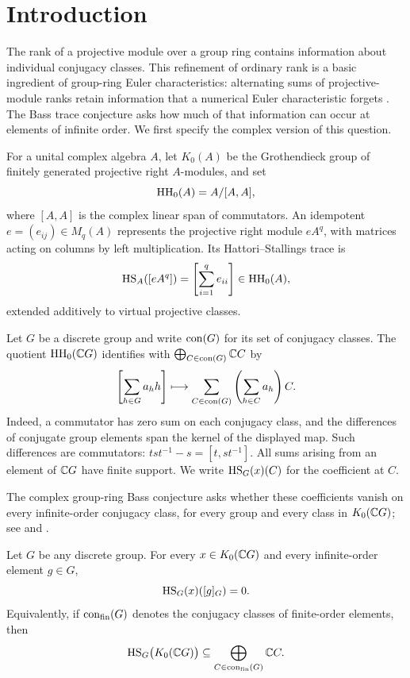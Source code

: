 \section{Introduction}
\label{sec:introduction}

The rank of a projective module over a group ring contains information
about individual conjugacy classes. This refinement of ordinary rank is
a basic ingredient of group-ring Euler characteristics: alternating sums
of projective-module ranks retain information that a numerical Euler
characteristic forgets \cite{Bass1976,Bass1979}. The Bass trace conjecture
asks how much of that information can occur at elements of infinite order.
We first specify the complex version of this question.

For a unital complex algebra $A$, let $K_0(A)$ be the Grothendieck group of
finitely generated projective right $A$-modules, and set
\[
 \operatorname{HH}_0(A)=A/[A,A],
\]
where $[A,A]$ is the complex linear span of commutators. An idempotent
$e=(e_{ij})\in M_q(A)$ represents the projective right module
$eA^q$, with matrices acting on columns by left multiplication. Its
Hattori--Stallings trace is
\[
 \operatorname{HS}_A([eA^q])=\left[\sum_{i=1}^q e_{ii}\right]\in\operatorname{HH}_0(A),
\]
extended additively to virtual projective classes.

Let $G$ be a discrete group and write $\operatorname{con}(G)$ for its set of conjugacy
classes. The quotient $\operatorname{HH}_0(\mathbb C G)$ identifies with
$\bigoplus_{C\in\operatorname{con}(G)}\mathbb C C$ by
\begin{equation}\label{eq:class-trace}
 \left[\sum_{h\in G}a_hh\right]
 \longmapsto
 \sum_{C\in\operatorname{con}(G)}\left(\sum_{h\in C}a_h\right)C.
\end{equation}
Indeed, a commutator has zero sum on each conjugacy class, and the
differences of conjugate group elements span the kernel of the displayed
map. Such differences are commutators: $tst^{-1}-s=[t,st^{-1}]$.
All sums arising from an element of $\mathbb C G$ have finite support.
We write $\operatorname{HS}_G(x)(C)$ for the coefficient at $C$.

The complex group-ring Bass conjecture asks whether these coefficients
vanish on every infinite-order conjugacy class, for every group and every
class in $K_0(\mathbb C G)$; see
\cite[Conjecture 2.1]{BCM2004} and \cite[Conjecture 2]{CM2011}.

\begin{theorem}\label{thm:bass}
Let $G$ be any discrete group. For every $x\in K_0(\mathbb C G)$ and every
infinite-order element $g\in G$,
\[
 \operatorname{HS}_G(x)([g]_G)=0.
\]
Equivalently, if $\operatorname{con}_{\mathrm{fin}}(G)$ denotes the conjugacy classes of
finite-order elements, then
\[
 \operatorname{HS}_G\bigl(K_0(\mathbb C G)\bigr)
 \subseteq\bigoplus_{C\in\operatorname{con}_{\mathrm{fin}}(G)}\mathbb C C.
\]
\end{theorem}

